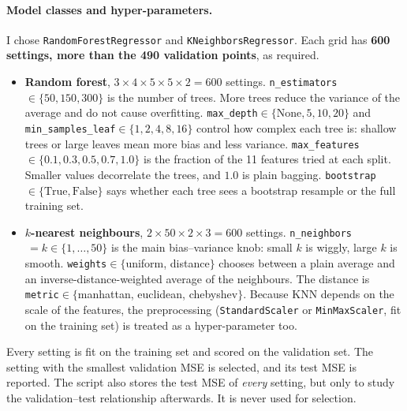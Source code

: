 \documentclass[11pt]{article}
\begin{document}
\paragraph{Model classes and hyper-parameters.} I chose \texttt{RandomForestRegressor} and
\texttt{KNeighborsRegressor}. Each grid has \textbf{600 settings, more than the 490 validation
points}, as required.
\begin{itemize}
\item \textbf{Random forest}, $3\times4\times5\times5\times2=600$ settings.
\texttt{n\_estimators}$\in\{50,150,300\}$ is the number of trees. More trees reduce the variance of
the average and do not cause overfitting. \texttt{max\_depth}$\in\{\text{None},5,10,20\}$ and
\texttt{min\_samples\_leaf}$\in\{1,2,4,8,16\}$ control how complex each tree is: shallow trees or
large leaves mean more bias and less variance. \texttt{max\_features}$\in\{0.1,0.3,0.5,0.7,1.0\}$ is
the fraction of the 11 features tried at each split. Smaller values decorrelate the trees, and $1.0$
is plain bagging. \texttt{bootstrap}$\in\{\text{True},\text{False}\}$ says whether each tree sees a
bootstrap resample or the full training set.
\item \textbf{$k$-nearest neighbours}, $2\times50\times2\times3=600$ settings.
\texttt{n\_neighbors}$\,=k\in\{1,\dots,50\}$ is the main bias--variance knob: small $k$ is wiggly,
large $k$ is smooth. \texttt{weights}$\in\{$uniform, distance$\}$ chooses between a plain average
and an inverse-distance-weighted average of the neighbours. The distance is
\texttt{metric}$\in\{$manhattan, euclidean, chebyshev$\}$. Because KNN depends on the scale of the
features, the preprocessing (\texttt{StandardScaler} or \texttt{MinMaxScaler}, fit on the training
set) is treated as a hyper-parameter too.
\end{itemize}
Every setting is fit on the training set and scored on the validation set. The setting with the
smallest validation MSE is selected, and its test MSE is reported. The script also stores the test
MSE of \emph{every} setting, but only to study the validation--test relationship afterwards. It is
never used for selection.
\end{document}
